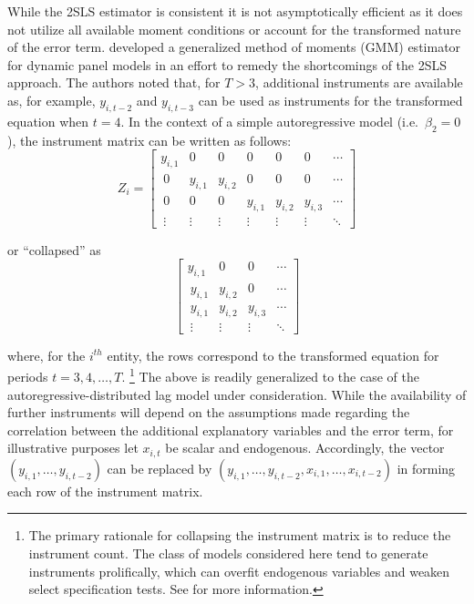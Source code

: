 \documentclass[english]{article}
\begin{document}
While the 2SLS estimator is consistent it is not asymptotically efficient as it 
does not utilize all available moment conditions or account for the 
transformed nature of the error term. 
\citet{arellano1991} developed a generalized method of moments (GMM) 
estimator for dynamic panel models in an effort to remedy the shortcomings 
of the 2SLS approach. 
The authors noted that, for $T>3$, additional instruments are available as, 
for example, $y_{i,t-2}$ and $y_{i,t-3}$ can be used as instruments for the 
transformed equation when $t=4$.
In the context of a simple autoregressive model (i.e.\ $\beta_2=0$), the 
instrument matrix can be written as follows:
\begin{equation}
Z_i = \left[ 
\begin{array}{ccccccc}
y_{i,1} & 0 & 0 & 0 & 0 & 0 & \cdots   \\\
0 & y_{i,1} & y_{i,2} & 0 & 0 & 0 & \cdots   \\\
0 & 0 & 0 & y_{i,1} & y_{i,2} & y_{i,3} & \cdots  \\\
\vdots & \vdots & \vdots & \vdots & \vdots & \vdots & \ddots
\end{array}
\right]
\label{z}
\end{equation}

\noindent
or ``collapsed'' as 
\begin{equation}
\left[ 
\begin{array}{ccccccc}
y_{i,1} & 0 & 0 & \cdots   \\\
y_{i,1} & y_{i,2} & 0 & \cdots   \\\
y_{i,1} & y_{i,2} & y_{i,3} & \cdots  \\\
\vdots & \vdots & \vdots & \ddots
\end{array}
\right]
\label{zc}
\end{equation}

\noindent
where, for the $i^{th}$ entity, the rows correspond to the transformed 
equation for periods $t=3,4,\ldots,T$.%
\footnote{The primary rationale for collapsing the instrument matrix is to
reduce the instrument count.  
The class of models considered here tend to generate instruments 
prolifically, which can overfit endogenous variables and weaken select
specification tests.
See \citet{roodman2009b} for more information.}
The above is readily generalized to the case of the autoregressive-distributed 
lag model under consideration. 
While the availability of further instruments will depend on the assumptions 
made regarding the correlation between the additional explanatory variables 
and the error term, for illustrative purposes let $x_{i,t}$ be scalar and 
endogenous. 
Accordingly, the vector $(y_{i,1}, \ldots, y_{i,t-2})$ can be replaced by 
$(y_{i,1}, \ldots, y_{i,t-2}, x_{i,1},\ldots,  x_{i,t-2})$ in forming 
each row of the instrument matrix. 
\end{document}
